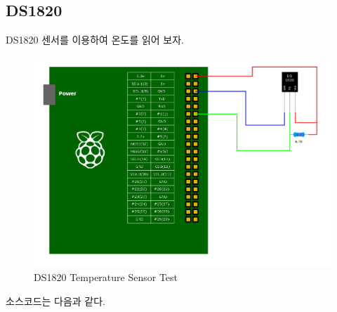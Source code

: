 \documentclass[11pt
  , a4paper
  , article
  , oneside
]{memoir}
\begin{document}
\subsection{DS1820}\label{subsec:ds1820App}
DS1820 센서를 이용하여 온도를 읽어 보자.
\begin{figure}[!htb]
\centering
\includegraphics[width=1\textwidth]{./images/raspberry/ds1820_test.png}
\caption{DS1820 Temperature Sensor Test}
\label{fig:ds1820_test}
\end{figure}
소스코드는 다음과 같다.
\end{document}
